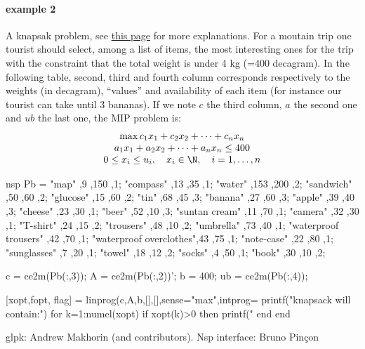 \begin{examples}
\paragraph{example 2} A knapsak problem, see
\href{http://rosettacode.org/wiki/Knapsack_problem/Bounded}{this page} for more explanations.
For a moutain trip one tourist should select, among a list of items, the most interesting
ones for the trip with the constraint that the total weight is under 4 kg (=400 decagram). 
In the following table, second, third and fourth column corresponds respectively to the weights 
(in decagram),  ``values'' and availability of each item (for instance our tourist can take 
until 3 bananas). If we note $c$ the third column, $a$ the second one and $ub$ the last one, 
the MIP problem is:
$$
\begin{array}{c}
   \max c_1 x_1 + c_2 x_2 + \dots + c_n x_n\\
      a_1 x_1 + a_2 x_2 + \dots + a_n x_n \le 400\\
      0 \le x_i \le u_i, \quad x_i \in \N, \quad i = 1, \dots, n
\end{array}
$$
\begin{mintednsp}{nsp}
Pb = { "map"   	        ,9    ,150   ,1;
       "compass"        ,13   ,35    ,1;
       "water" 	        ,153  ,200   ,2;
       "sandwich"       ,50   ,60    ,2;
       "glucose"        ,15   ,60    ,2;
       "tin"   	        ,68   ,45    ,3;
       "banana"         ,27   ,60    ,3;
       "apple" 	        ,39   ,40    ,3;
       "cheese"         ,23   ,30    ,1;
       "beer"  	        ,52   ,10    ,3;
       "suntan cream"   ,11   ,70    ,1;
       "camera"         ,32   ,30    ,1;
       "T-shirt"        ,24   ,15    ,2;
       "trousers"       ,48   ,10    ,2;
       "umbrella"       ,73   ,40    ,1;
  "waterproof trousers" ,42   ,70    ,1;
"waterproof overclothes",43   ,75    ,1;
       "note-case"      ,22   ,80    ,1;
       "sunglasses"     ,7    ,20    ,1;
       "towel" 	        ,18   ,12    ,2;
       "socks" 	        ,4    ,50    ,1;
       "book"  	        ,30   ,10    ,2};

c = ce2m(Pb(:,3));
A = ce2m(Pb(:,2))';
b = 400;
ub = ce2m(Pb(:,4));

[xopt,fopt, flag] = linprog(c,A,b,[],[],sense="max",intprog=%
printf("\nMy knapsack will contain:\n")
for k=1:numel(xopt)
   if xopt(k)>0 then
      printf("    %
   end
end
\end{mintednsp}

\end{examples}

\begin{manseealso}

\end{manseealso}

\begin{authors}
 glpk: Andrew Makhorin (and contributors). Nsp interface: Bruno Pin\c{c}on
\end{authors}
